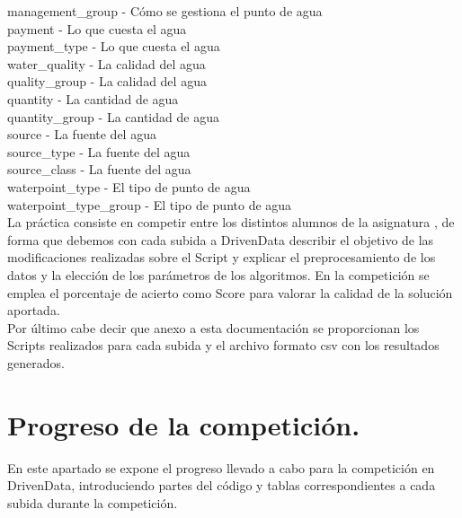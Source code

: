 	management\_group - Cómo se gestiona el punto de agua\\
	payment - Lo que cuesta el agua\\
	payment\_type - Lo que cuesta el agua \\
	water\_quality - La calidad del agua\\
	quality\_group - La calidad del agua\\
	quantity - La cantidad de agua\\
	quantity\_group - La cantidad de agua\\
	source - La fuente del agua\\
	source\_type - La fuente del agua\\
	source\_class - La fuente del agua\\
	waterpoint\_type - El tipo de punto de agua\\
	waterpoint\_type\_group - El tipo de punto de agua\\
	
	La práctica consiste en competir entre los distintos alumnos de la asignatura , de forma que debemos con cada subida a DrivenData describir el objetivo de las modificaciones realizadas sobre el Script y explicar el preprocesamiento de los datos y la elección de los parámetros de los algoritmos. En la competición se emplea el porcentaje de acierto como Score para valorar la calidad de la solución aportada.\\
	
	Por último cabe decir que anexo a esta documentación se proporcionan los Scripts realizados para cada subida y el archivo formato csv con los resultados generados. \\
	
	
	\section[Progreso de la competición]{Progreso de la competición.}
	
	En este apartado se expone el progreso llevado a cabo para la competición en DrivenData, introduciendo partes del código y tablas correspondientes a cada subida durante la competición. \\
	
	
